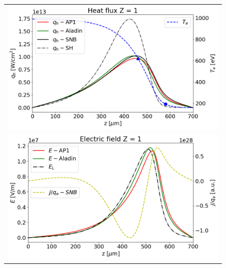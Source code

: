\begin{figure}[htb]
  \begin{center}
    \begin{tabular}{c}
      \includegraphics[width=\figscale\textwidth]{../VFPdata/C7_Aladin_case5_heatflux.png} \\
      \includegraphics[width=\figscale\textwidth]{../VFPdata/C7_Aladin_case5_Efield.png} \\

\end{tabular}
\end{center}
\end{figure}
